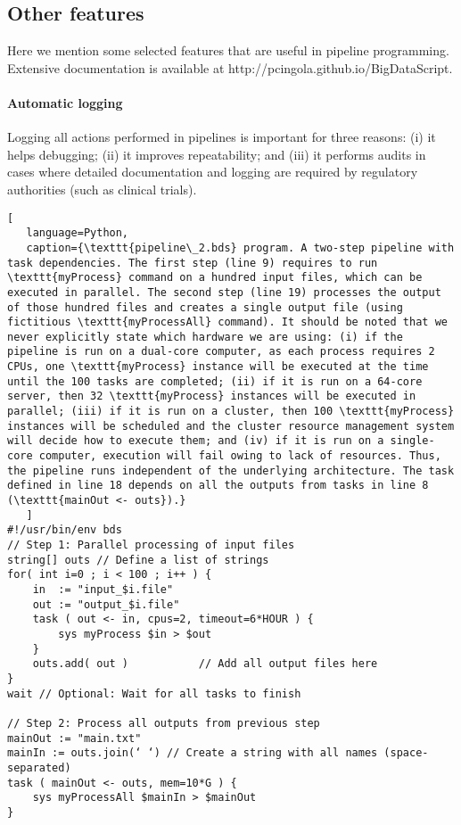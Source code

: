 \subsection{Other features}

Here we mention some selected features that are useful in pipeline programming. Extensive documentation is available at http://pcingola.github.io/BigDataScript.

\paragraph{Automatic logging} Logging all actions performed in pipelines is important for three reasons: (i) it helps debugging; (ii) it improves repeatability; and (iii) it performs audits in cases where detailed documentation and logging are required by regulatory authorities (such as clinical trials).

\begin{lstlisting}[
   language=Python,
   caption={\texttt{pipeline\_2.bds} program. A two-step pipeline with task dependencies. The first step (line 9) requires to run \texttt{myProcess} command on a hundred input files, which can be executed in parallel. The second step (line 19) processes the output of those hundred files and creates a single output file (using fictitious \texttt{myProcessAll} command). It should be noted that we never explicitly state which hardware we are using: (i) if the pipeline is run on a dual-core computer, as each process requires 2 CPUs, one \texttt{myProcess} instance will be executed at the time until the 100 tasks are completed; (ii) if it is run on a 64-core server, then 32 \texttt{myProcess} instances will be executed in parallel; (iii) if it is run on a cluster, then 100 \texttt{myProcess} instances will be scheduled and the cluster resource management system will decide how to execute them; and (iv) if it is run on a single-core computer, execution will fail owing to lack of resources. Thus, the pipeline runs independent of the underlying architecture. The task defined in line 18 depends on all the outputs from tasks in line 8 (\texttt{mainOut <- outs}).}
   ]
#!/usr/bin/env bds
// Step 1: Parallel processing of input files
string[] outs // Define a list of strings 
for( int i=0 ; i < 100 ; i++ ) {
    in  := "input_$i.file"
    out := "output_$i.file"
    task ( out <- in, cpus=2, timeout=6*HOUR ) {
        sys myProcess $in > $out
    }
    outs.add( out )           // Add all output files here
}
wait // Optional: Wait for all tasks to finish

// Step 2: Process all outputs from previous step
mainOut := "main.txt"
mainIn := outs.join(‘ ‘) // Create a string with all names (space-separated)
task ( mainOut <- outs, mem=10*G ) {
    sys myProcessAll $mainIn > $mainOut
}
\end{lstlisting}

